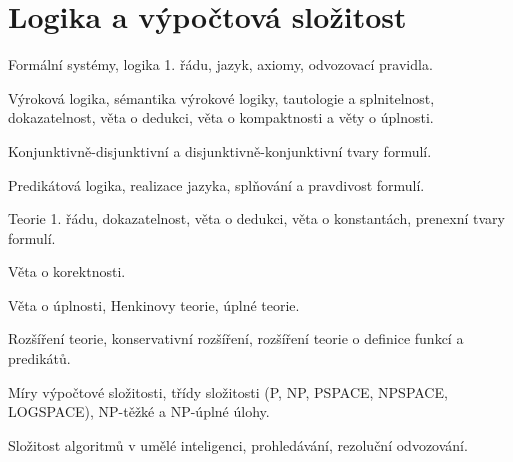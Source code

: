 \newpage
\section{Logika a výpočtová složitost}
\begin{pozadavky}
\begin{pitemize}
\item Formální systémy, logika 1. řádu, jazyk, axiomy, odvozovací pravidla.
\item Výroková logika, sémantika výrokové logiky, tautologie a splnitelnost, dokazatelnost, věta o dedukci, věta o kompaktnosti a věty o úplnosti.
\item Konjunktivně-disjunktivní a disjunktivně-konjunktivní tvary formulí.
\item Predikátová logika, realizace jazyka, splňování a pravdivost formulí.
\item Teorie 1. řádu, dokazatelnost, věta o dedukci, věta o konstantách, prenexní tvary formulí.
\item Věta o korektnosti.
\item Věta o úplnosti, Henkinovy teorie, úplné teorie.
\item Rozšíření teorie, konservativní rozšíření, rozšíření teorie o definice funkcí a predikátů.
\item Míry výpočtové složitosti, třídy složitosti (P, NP, PSPACE, NPSPACE, LOGSPACE), NP-těžké a NP-úplné úlohy.
\item Složitost algoritmů v umělé inteligenci, prohledávání, rezoluční odvozování.
\end{pitemize}
\end{pozadavky}